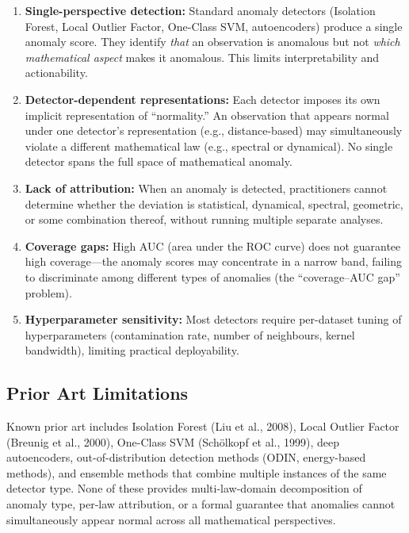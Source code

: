 \documentclass[12pt,a4paper]{article}
\begin{document}
\begin{enumerate}[label=(\alph*)]
\item \textbf{Single-perspective detection:} Standard anomaly detectors 
(Isolation Forest, Local Outlier Factor, One-Class SVM, autoencoders) 
produce a single anomaly score. They identify \emph{that} an observation 
is anomalous but not \emph{which mathematical aspect} makes it anomalous. 
This limits interpretability and actionability.

\item \textbf{Detector-dependent representations:} Each detector imposes its 
own implicit representation of ``normality.'' An observation that appears 
normal under one detector's representation (e.g., distance-based) may 
simultaneously violate a different mathematical law (e.g., spectral or 
dynamical). No single detector spans the full space of mathematical anomaly.

\item \textbf{Lack of attribution:} When an anomaly is detected, 
practitioners cannot determine whether the deviation is statistical, 
dynamical, spectral, geometric, or some combination thereof, without running 
multiple separate analyses.

\item \textbf{Coverage gaps:} High AUC (area under the ROC curve) does not 
guarantee high coverage---the anomaly scores may concentrate in a narrow 
band, failing to discriminate among different types of anomalies (the 
``coverage--AUC gap'' problem).

\item \textbf{Hyperparameter sensitivity:} Most detectors require per-dataset 
tuning of hyperparameters (contamination rate, number of neighbours, kernel 
bandwidth), limiting practical deployability.
\end{enumerate}

\subsection{Prior Art Limitations}

Known prior art includes Isolation Forest (Liu et al., 2008), Local Outlier 
Factor (Breunig et al., 2000), One-Class SVM (Sch\"olkopf et al., 1999), 
deep autoencoders, out-of-distribution detection methods (ODIN, energy-based 
methods), and ensemble methods that combine multiple instances of the same 
detector type. None of these provides multi-law-domain decomposition of 
anomaly type, per-law attribution, or a formal guarantee that anomalies 
cannot simultaneously appear normal across all mathematical perspectives.
\end{document}
